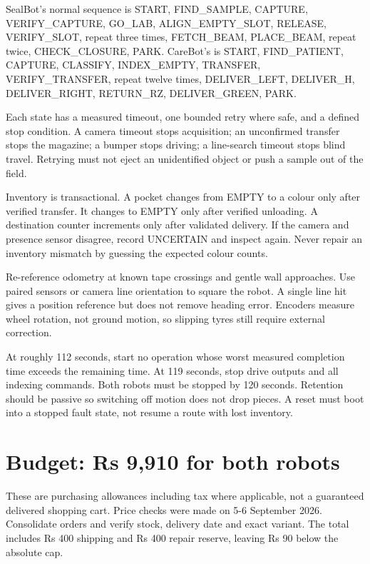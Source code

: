 \documentclass[10pt,a4paper]{article}
\begin{document}
SealBot's normal sequence is START, FIND\_SAMPLE, CAPTURE, VERIFY\_CAPTURE, GO\_LAB, ALIGN\_EMPTY\_SLOT, RELEASE, VERIFY\_SLOT, repeat three times, FETCH\_BEAM, PLACE\_BEAM, repeat twice, CHECK\_CLOSURE, PARK. CareBot's is START, FIND\_PATIENT, CAPTURE, CLASSIFY, INDEX\_EMPTY, TRANSFER, VERIFY\_TRANSFER, repeat twelve times, DELIVER\_LEFT, DELIVER\_H, DELIVER\_RIGHT, RETURN\_RZ, DELIVER\_GREEN, PARK.

Each state has a measured timeout, one bounded retry where safe, and a defined stop condition. A camera timeout stops acquisition; an unconfirmed transfer stops the magazine; a bumper stops driving; a line-search timeout stops blind travel. Retrying must not eject an unidentified object or push a sample out of the field.

Inventory is transactional. A pocket changes from EMPTY to a colour only after verified transfer. It changes to EMPTY only after verified unloading. A destination counter increments only after validated delivery. If the camera and presence sensor disagree, record UNCERTAIN and inspect again. Never repair an inventory mismatch by guessing the expected colour counts.

Re-reference odometry at known tape crossings and gentle wall approaches. Use paired sensors or camera line orientation to square the robot. A single line hit gives a position reference but does not remove heading error. Encoders measure wheel rotation, not ground motion, so slipping tyres still require external correction.

At roughly 112 seconds, start no operation whose worst measured completion time exceeds the remaining time. At 119 seconds, stop drive outputs and all indexing commands. Both robots must be stopped by 120 seconds. Retention should be passive so switching off motion does not drop pieces. A reset must boot into a stopped fault state, not resume a route with lost inventory.

\clearpage
{}\section{Budget: Rs 9,910 for both robots}
These are purchasing allowances including tax where applicable, not a guaranteed delivered shopping cart. Price checks were made on 5-6 September 2026. Consolidate orders and verify stock, delivery date and exact variant. The total includes Rs 400 shipping and Rs 400 repair reserve, leaving Rs 90 below the absolute cap.
\end{document}
